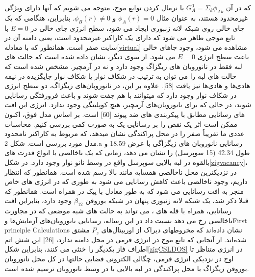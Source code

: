 که در آن $G^0_A =\Sigma_k \phi_{Ak}$ با نرمال کردن توابع موج، متوجه می شویم که آنها دارای ویژگی غیرمحدود هستند، به عنوان مثال $\phi_{A}(r) = 0$ و $\phi_{B}(r)\neq 0$. بنابراین، هنگامی که یک جای خالی روی شبکه لانه زنبوری ایجاد می شود، سطح انرژی جای خالی در $E = 0$ با تابع موجی ظاهر می شود که دارای یک کاراکتر غیرمحدود است، یعنی دامنه آن در سایت  صفر است. همانطور که با معادله\ref{virtual} مشاهده می شود، وجود جاهای خالی باعث سطح انرژی $E = 0$ می شود. از سوی دیگر، نشان داده شده است که حالت های لبه فقط در نانوروبان های زیگزاگ وجود دارد و نه در آرمچیر. مشخص شده است که حالت های لبه را می توان به ترتیب در شکاف نوار یا شکاف نوار جایگزیده در نیمه هادی‌ها و هادی‌ها نیز یافت [58]. علاوه بر این، در نانوروبان‌های زیگزاگ، دو سطح انرژی در شکاف نوار وجود دارد که میتوانند با هم جفت شوند و باعث فرورفتگی رسانایی شوند، در حالی که برای نانوروبان‌های آرمچیر، هیچ کوپلینگی وجود ندارد. انرژی این افت های رسانایی مطابق با پیکربندی های ضد پیوند [60] است. بر اساس مدل فوق، اکنون ممکن است اثر یک نقص را بر رسانایی یک  به صورت کمی بررسی کنیم. محاسبات عددی ما  تقریباً صفر را در محل پراکندگی نشان میدهد، که مربوط به کاراکتر نامحدود مدل مورد بررسی است. شکل 2.a رسانایی نانوروبان های زیگزاگی با عرض \lr{\AA} 18.59 و طول \lr{\AA}42.34 (15 سوپرسل) را نشان می دهد، زمانی که یک ناخالصی با انواع قدرت های بالقوه در لبه بالایی سوپرسل واقع در وسط نانو نوار وجود دارد. در شکل\ref{zigvacancy}،  در نزدیکترین محل ناخالصی همسایه مانند بالا رسم شده است. همانطور که انتظار داریم، وجود ناخالصی باعث کاهش رسانایی می شود به طوری که در انرژی های خاص منجر به افت رسانایی می شود که به طور معادل با پیک در  همراه است. همانطور که قبلا ذکر شد، یک شبکه لانه زنبوری پنهان در شبکه بوروفن $\beta_{12}$ وجود دارد، بنابراین افت رسانایی، همراه با قله های ، می تواند به حالت های شبه موضعی که در مجاورت ناخالصی رخ می دهد نسبت داد
در این رساله، رسانایی نانوروبان‌های 
آزمایش‌ها و\gls{First principle Calculations} نشان داده‌اند که مخروطهای دیراک از اوربیتال‌های $P_z$ مشتق شده‌اند. از آنجایی که تابع موج در انرژی فرمی در محل  دامنه ندارد، [26] این شش اتم اطراف فاز یکدیگر را خنثی می کنند، بنابراین شکل\ref{zigCSLDOS} در انرژی متناظر تا اوج  در نزدیکی انرژی فرمی، چگالی الکترونی فضایی حالتها در کل محل نانوروبان بوروفن زیگزاگ با محل پراکندگی در لبه بالایی با  در وسط نانوروبان ترسیم شده است. 

